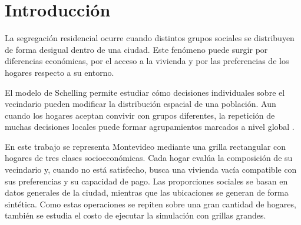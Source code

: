 \section{Introducción}

La segregación residencial ocurre cuando distintos grupos sociales se distribuyen de forma desigual dentro de una ciudad. Este fenómeno puede surgir por diferencias económicas, por el acceso a la vivienda y por las preferencias de los hogares respecto a su entorno.

El modelo de Schelling permite estudiar cómo decisiones individuales sobre el vecindario pueden modificar la distribución espacial de una población. Aun cuando los hogares aceptan convivir con grupos diferentes, la repetición de muchas decisiones locales puede formar agrupamientos marcados a nivel global \cite{schelling1971}.

En este trabajo se representa Montevideo mediante una grilla rectangular con hogares de tres clases socioeconómicas. Cada hogar evalúa la composición de su vecindario y, cuando no está satisfecho, busca una vivienda vacía compatible con sus preferencias y su capacidad de pago. Las proporciones sociales se basan en datos generales de la ciudad, mientras que las ubicaciones se generan de forma sintética. Como estas operaciones se repiten sobre una gran cantidad de hogares, también se estudia el costo de ejecutar la simulación con grillas grandes.
